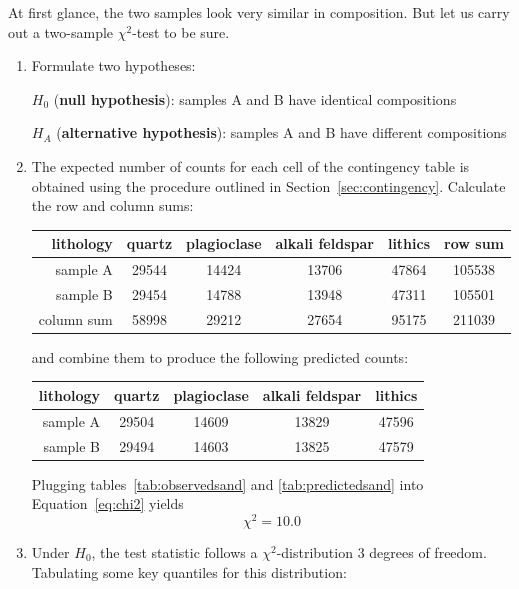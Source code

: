 At first glance, the two samples look very similar in composition. But
let us carry out a two-sample $\chi^2$-test to be sure.

\begin{enumerate}
\item  Formulate two hypotheses:

  $H_0$ (\textbf{null hypothesis}):
  samples A and B have identical compositions

  $H_{\!A}$ (\textbf{alternative hypothesis}):
  samples A and B have different compositions
  
\item The expected number of counts for each cell of the contingency
  table is obtained using the procedure outlined in
  Section~\ref{sec:contingency}. Calculate the row and column sums:

  \begin{center}
    \begin{tabular}{r|cccc|c}
      lithology & quartz & plagioclase & alkali feldspar &
      lithics & row sum \\ \hline
      sample A & 29544 & 14424 & 13706 & 47864 & 105538 \\
      sample B & 29454 & 14788 & 13948 & 47311 & 105501 \\ \hline
      column sum & 58998 & 29212 & 27654 & 95175 & 211039
    \end{tabular}
  \end{center}

  \noindent and combine them to produce the following predicted
  counts:

  \begin{center}
    \begin{tabular}{r|cccc}
      lithology & quartz & plagioclase & alkali feldspar & lithics  \\ \hline
      sample A & 29504 & 14609 & 13829 & 47596 \\
      sample B & 29494 & 14603 & 13825 & 47579 \\
    \end{tabular}
    \label{tab:predictedsand}
  \end{center}

  Plugging tables~\ref{tab:observedsand} and \ref{tab:predictedsand}
  into Equation~\ref{eq:chi2} yields
  \[
  \chi^2 = 10.0
  \]

\item Under $H_0$, the test statistic follows a
  $\chi^2$-distribution 3 degrees of freedom. Tabulating some key
  quantiles for this distribution:


\end{enumerate}
